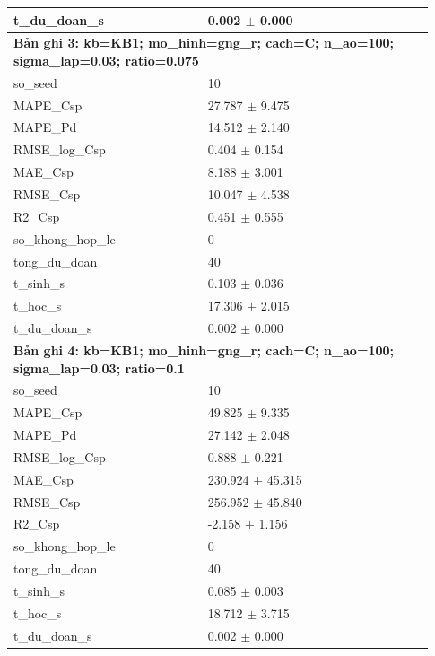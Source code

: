 \begin{longtable}{p{0.43\linewidth}p{0.50\linewidth}}
t\_\allowbreak du\_\allowbreak doan\_\allowbreak s & 0.002 $\pm$ 0.000 \\
\midrule
\multicolumn{2}{p{0.95\linewidth}}{\textbf{Bản ghi 3: kb=KB1; mo\_hinh=gng\_r; cach=C; n\_ao=100; sigma\_lap=0.03; ratio=0.075}} \\
so\_\allowbreak seed & 10 \\
MAPE\_\allowbreak Csp & 27.787 $\pm$ 9.475 \\
MAPE\_\allowbreak Pd & 14.512 $\pm$ 2.140 \\
RMSE\_\allowbreak log\_\allowbreak Csp & 0.404 $\pm$ 0.154 \\
MAE\_\allowbreak Csp & 8.188 $\pm$ 3.001 \\
RMSE\_\allowbreak Csp & 10.047 $\pm$ 4.538 \\
R2\_\allowbreak Csp & 0.451 $\pm$ 0.555 \\
so\_\allowbreak khong\_\allowbreak hop\_\allowbreak le & 0 \\
tong\_\allowbreak du\_\allowbreak doan & 40 \\
t\_\allowbreak sinh\_\allowbreak s & 0.103 $\pm$ 0.036 \\
t\_\allowbreak hoc\_\allowbreak s & 17.306 $\pm$ 2.015 \\
t\_\allowbreak du\_\allowbreak doan\_\allowbreak s & 0.002 $\pm$ 0.000 \\
\midrule
\multicolumn{2}{p{0.95\linewidth}}{\textbf{Bản ghi 4: kb=KB1; mo\_hinh=gng\_r; cach=C; n\_ao=100; sigma\_lap=0.03; ratio=0.1}} \\
so\_\allowbreak seed & 10 \\
MAPE\_\allowbreak Csp & 49.825 $\pm$ 9.335 \\
MAPE\_\allowbreak Pd & 27.142 $\pm$ 2.048 \\
RMSE\_\allowbreak log\_\allowbreak Csp & 0.888 $\pm$ 0.221 \\
MAE\_\allowbreak Csp & 230.924 $\pm$ 45.315 \\
RMSE\_\allowbreak Csp & 256.952 $\pm$ 45.840 \\
R2\_\allowbreak Csp & -2.158 $\pm$ 1.156 \\
so\_\allowbreak khong\_\allowbreak hop\_\allowbreak le & 0 \\
tong\_\allowbreak du\_\allowbreak doan & 40 \\
t\_\allowbreak sinh\_\allowbreak s & 0.085 $\pm$ 0.003 \\
t\_\allowbreak hoc\_\allowbreak s & 18.712 $\pm$ 3.715 \\
t\_\allowbreak du\_\allowbreak doan\_\allowbreak s & 0.002 $\pm$ 0.000 \\

\end{longtable}

